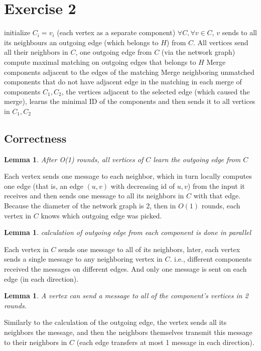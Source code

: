 \documentclass[11pt]{article}
\newtheorem{lemma}[theorem]{Lemma}
\begin{document}
\section{Exercise 2}
\begin{algorithmic}[1]
\State initialize $C_i = {v_i}$ (each vertex as a separate component)
    \State $\forall C, \forall v\in C$, $v$ sends to all its neighbours an outgoing edge (which belongs to $H$) from $C$.
    \State All vertices send all their neighbors in $C$, one outgoing edge from $C$ (via the network graph)
    \State compute maximal matching on outgoing edges that belongs to $H$
    \State Merge components adjacent to the edges of the matching
    \State Merge neighboring unmatched components that do not have adjacent edge in the matching
    \State in each merge of components $C_1, C_2$, the vertices adjacent to the selected edge (which caused the merge), learns the minimal ID of the components and then sends it to all vertices in $C_1, C_2$
    \EndWhile
\end{algorithmic}

\subsection*{Correctness}

\begin{lemma}
After O(1) rounds, all vertices of $C$ learn the outgoing edge from $C$ 
\end{lemma}
Each vertex sends one message to each neighbor, which in turn locally computes one edge (that is, an edge $(u,v)$ with decreasing id of $u,v$) from the input it receives and then sends one message to all its neighbors in $C$ with that edge.
Because the diameter of the network graph is 2, then in $O(1)$ rounds, each vertex in $C$ knows which outgoing edge was picked.

\begin{lemma}
calculation of outgoing edge from each component is done in parallel
\end{lemma}
Each vertex in $C$ sends one message to all of its neighbors, later, each vertex sends a single message to any neighboring vertex in $C$. i.e., different components received the messages on different edges. And only one message is sent on each edge (in each direction). 

\begin{lemma}
\label{message_transfer_2_rounds}
A vertex can send a message to all of the component's vertices in 2 rounds.
\end{lemma}
Similarly to the calculation of the outgoing edge, the vertex sends all its neighbors the message, and then the neighbors themselves transmit this message to their neighbors in $C$ (each edge transfers at most 1 message in each direction).
\end{document}
